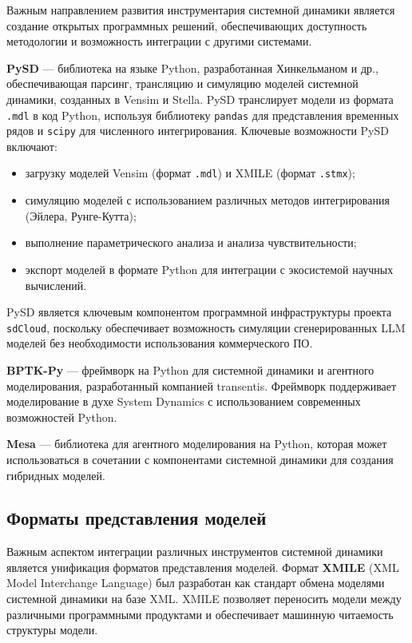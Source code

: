 Важным направлением развития инструментария системной динамики является создание открытых программных решений, обеспечивающих доступность методологии и возможность интеграции с другими системами.

\textbf{PySD} \cite{pysd2021} --- библиотека на языке Python, разработанная Хинкельманом и др., обеспечивающая парсинг, трансляцию и симуляцию моделей системной динамики, созданных в Vensim и Stella. PySD транслирует модели из формата \texttt{.mdl} в код Python, используя библиотеку \texttt{pandas} для представления временных рядов и \texttt{scipy} для численного интегрирования. Ключевые возможности PySD включают:

\begin{itemize}
    \item загрузку моделей Vensim (формат \texttt{.mdl}) и XMILE (формат \texttt{.stmx});
    \item симуляцию моделей с использованием различных методов интегрирования (Эйлера, Рунге-Кутта);
    \item выполнение параметрического анализа и анализа чувствительности;
    \item экспорт моделей в формате Python для интеграции с экосистемой научных вычислений.
\end{itemize}

PySD является ключевым компонентом программной инфраструктуры проекта \texttt{sdCloud}, поскольку обеспечивает возможность симуляции сгенерированных LLM моделей без необходимости использования коммерческого ПО.

\textbf{BPTK-Py} --- фреймворк на Python для системной динамики и агентного моделирования, разработанный компанией transentis. Фреймворк поддерживает моделирование в духе System Dynamics с использованием современных возможностей Python.

\textbf{Mesa} --- библиотека для агентного моделирования на Python, которая может использоваться в сочетании с компонентами системной динамики для создания гибридных моделей.

\subsection{Форматы представления моделей}

Важным аспектом интеграции различных инструментов системной динамики является унификация форматов представления моделей. Формат \textbf{XMILE} (XML Model Interchange Language) \cite{xmile2015} был разработан как стандарт обмена моделями системной динамики на базе XML. XMILE позволяет переносить модели между различными программными продуктами и обеспечивает машинную читаемость структуры модели.

